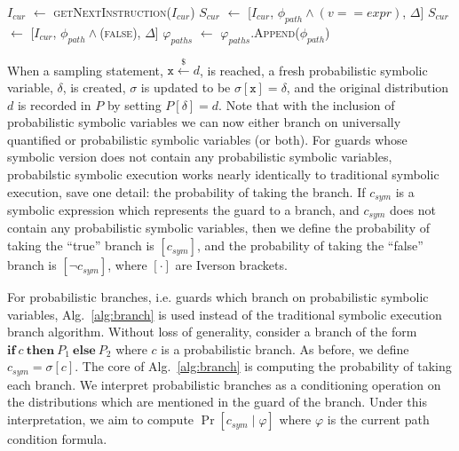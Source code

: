 \documentclass[acmsmall]{acmart}\settopmatter{}
\newcommand*\Let[2]{\State #1 $\gets$ #2}
\begin{document}
\begin{algorithm}
\begin{algorithmic}[1]
						\EndIf
					\EndCase
					 
						\Let{$I_{cur}$}{\textsc{getNextInstruction}($I_{cur}$)}	
							\Let{$S_{cur}$}{[$I_{cur}$, $\phi_{path} \wedge (v == expr)$, $\Delta$]}
						\Else 
							\Let{$S_{cur}$}{[$I_{cur}$, $\phi_{path} \wedge $(\textsc{false}), $\Delta$]}
						\EndIf
					\EndCase
					 
						\Let{$\varphi_{paths}$}{$\varphi_{paths}$.\textsc{Append}($\phi_{path}$)}		
					\EndCase
					\EndSwitch
				\EndWhile \\
			\EndFunction
		\end{algorithmic}
	\end{algorithm}

	When a sampling statement, $\mathtt{x} \xleftarrow{\$} d$, is reached, a fresh probabilistic symbolic variable, $\delta$, is created, $\sigma$ is updated to be $\sigma[\mathtt{x}] = \delta$, and the original distribution $d$ is recorded in $P$ by setting $P[\delta] = d$.
	Note that with the inclusion of probabilistic symbolic variables we can now either branch on universally quantified or probabilistic symbolic variables (or both).
	For guards whose symbolic version does not contain any probabilistic symbolic variables, probabilstic symbolic execution works nearly identically to traditional symbolic execution, save one detail: the probability of taking the branch. 
	If $c_{sym}$ is a symbolic expression which represents the guard to a branch, and $c_{sym}$ does not contain any probabilistic symbolic variables, then we define the probability of taking the ``true'' branch is $[c_{sym}]$, and the probability of taking the ``false'' branch is $[\neg c_{sym}]$, where $[\cdot]$ are Iverson brackets.
	
	
	For probabilistic branches, i.e. guards which branch on probabilistic symbolic variables, Alg.~\ref{alg:branch} is used instead of the traditional symbolic execution branch algorithm.
	Without loss of generality, consider a branch of the form $\mathbf{if}~c~\mathbf{then}~P_1~\mathbf{else}~P_2$ where $c$ is a probabilistic branch.
	As before, we define $c_{sym} = \sigma[c]$.
	The core of Alg.~\ref{alg:branch} is computing the probability of taking each branch.
	We interpret probabilistic branches as a conditioning operation on the distributions which are mentioned in the guard of the branch.
	Under this interpretation, we aim to compute $\Pr[c_{sym} \mid \varphi]$ where $\varphi$ is the current path condition formula.  
	
\end{document}
